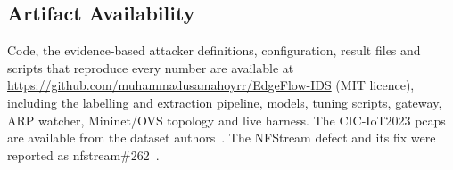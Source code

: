 \subsection{Artifact Availability}

Code, the evidence-based attacker definitions, configuration, result files and scripts that reproduce every number are available at \url{https://github.com/muhammadusamahoyrr/EdgeFlow-IDS} (MIT licence), including the labelling and extraction pipeline, models, tuning scripts, gateway, ARP watcher, Mininet/OVS topology and live harness. The CIC-IoT2023 pcaps are available from the dataset authors~\cite{neto2023ciciot2023}. The NFStream defect and its fix were reported as nfstream\#262~\cite{nfstream262}.
